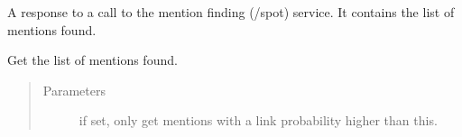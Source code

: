 \documentclass[letterpaper,10pt,english]{sphinxmanual}
\begin{document}
\begin{fulllineitems}
\label{\detokenize{code_comment/tweet_processor:hate_tweet_map.tweets_processor.MyTagMe.MentionsResponse}}
\sphinxAtStartPar
A response to a call to the mention finding (/spot) service. It contains the list of mentions
found.

\begin{fulllineitems}
\label{\detokenize{code_comment/tweet_processor:hate_tweet_map.tweets_processor.MyTagMe.MentionsResponse.get_mentions}}
\sphinxAtStartPar
Get the list of mentions found.
\begin{quote}\begin{description}
\item[{Parameters}] \leavevmode
\sphinxAtStartPar
{} \textendash{} if set, only get mentions with a link probability higher than this.

\end{description}\end{quote}

\end{fulllineitems}


\end{fulllineitems}

\end{document}
